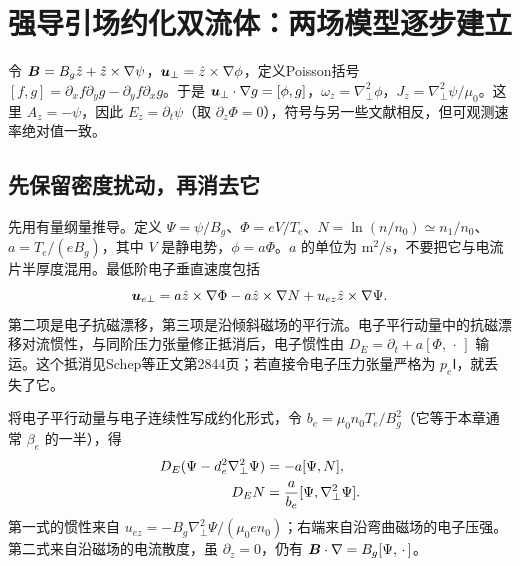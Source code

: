 \documentclass[UTF8,a4paper,11pt,openany,fontset=fandol]{ctexbook}
\begin{document}
\section{强导引场约化双流体：两场模型逐步建立}
令 $\bm{B}=B_g\hat z+\hat z\times\nabla\psi$，$\bm{u}_\perp=\hat z\times\nabla\phi$，定义Poisson括号
$[f,g]=\partial_xf\partial_yg-\partial_yf\partial_xg$。于是 $\bm{u}_\perp\cdot\nabla g=[\phi,g]$，$\omega_z=\nabla_\perp^2\phi$，$J_z=\nabla_\perp^2\psi/\mu_0$。这里 $A_z=-\psi$，因此 $E_z=\partial_t\psi$（取 $\partial_z\Phi=0$），符号与另一些文献相反，但可观测速率绝对值一致。

\subsection{先保留密度扰动，再消去它}
先用有量纲量推导。定义 $\Psi=\psi/B_g$、$\Phi=eV/T_e$、$N=\ln(n/n_0)\simeq n_1/n_0$、$a=T_e/(eB_g)$，其中 $V$ 是静电势，$\phi=a\Phi$。$a$ 的单位为 $\mathrm{m^2/s}$，不要把它与电流片半厚度混用。最低阶电子垂直速度包括
\begin{equation}
\bm{u}_{e\perp}=a\hat z\times\nabla\Phi-a\hat z\times\nabla N+u_{ez}\hat z\times\nabla\Psi.
\end{equation}
第二项是电子抗磁漂移，第三项是沿倾斜磁场的平行流。电子平行动量中的抗磁漂移对流惯性，与同阶压力张量修正抵消后，电子惯性由 $D_E=\partial_t+a[\Phi,\,\cdot\,]$ 输运。这个抵消见Schep等正文第2844页；若直接令电子压力张量严格为 $p_e\mathsf I$，就丢失了它。

将电子平行动量与电子连续性写成约化形式，令 $b_e=\mu_0n_0T_e/B_g^2$（它等于本章通常 $\beta_e$ 的一半），得
\begin{align}
D_E(\Psi-d_e^2\nabla_\perp^2\Psi)&=-a[\Psi,N],\label{eq:reducedelectron}\\
D_EN&={a\over b_e}[\Psi,\nabla_\perp^2\Psi].\label{eq:reduceddensity}
\end{align}
第一式的惯性来自 $u_{ez}=-B_g\nabla_\perp^2\Psi/(\mu_0en_0)$；右端来自沿弯曲磁场的电子压强。第二式来自沿磁场的电流散度，虽 $\partial_z=0$，仍有 $\bm{B}\cdot\nabla=B_g[\Psi,\,\cdot\,]$。
\end{document}
